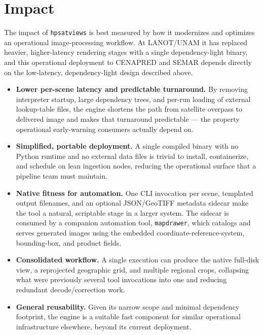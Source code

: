 \documentclass[preprint,12pt]{elsarticle}
\begin{document}
\section{Impact}
\label{sec:impact}

The impact of \texttt{hpsatviews} is best measured by how it modernizes and
optimizes an operational image-processing workflow. At LANOT/UNAM it has
replaced heavier, higher-latency rendering stages with a single dependency-light
binary, and this operational deployment to CENAPRED and SEMAR depends directly
on the low-latency, dependency-light design described above.

\begin{itemize}
    \item \textbf{Lower per-scene latency and predictable turnaround.} By
    removing interpreter startup, large dependency trees, and per-run loading of
    external lookup-table files, the engine shortens the path from satellite
    overpass to delivered image and makes that turnaround predictable ---
    the property operational early-warning consumers actually depend on.
    \item \textbf{Simplified, portable deployment.} A single compiled binary
    with no Python runtime and no external data files is trivial to install,
    containerize, and schedule on lean ingestion nodes, reducing the operational
    surface that a pipeline team must maintain.
    \item \textbf{Native fitness for automation.} One CLI invocation per scene,
    templated output filenames, and an optional JSON/GeoTIFF metadata sidecar
    make the tool a natural, scriptable stage in a larger system. The sidecar is
    consumed by a companion automation tool, \texttt{mapdrawer}, which catalogs
    and serves generated images using the embedded coordinate-reference-system,
    bounding-box, and product fields.
    \item \textbf{Consolidated workflow.} A single execution can produce the
    native full-disk view, a reprojected geographic grid, and multiple regional
    crops, collapsing what were previously several tool invocations into one and
    reducing redundant decode/correction work.
    \item \textbf{General reusability.} Given its narrow scope and minimal
    dependency footprint, the engine is a suitable fast component for similar
    operational infrastructure elsewhere, beyond its current deployment.
\end{itemize}
\end{document}

